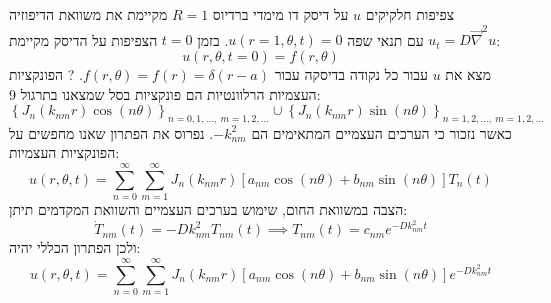 \documentclass{tstextbook}
\begin{document}
צפיפות חלקיקים \(u\) על דיסק דו מימדי ברדיוס \(R=1\) מקיימת את משוואת הדיפוזיה \(u_{t}=D\vec{\nabla} ^2u\) עם תנאי שפה \(u\left( r=1,\theta,t \right)=0\). בזמן \(t=0\) הצפיפות על הדיסק מקיימת:
$$u\left( r,\theta,t=0 \right)=f\left( r,\theta \right)$$
מצא את \(u\) עבור כל נקודה בדיסקה עבור \(f\left( r,\theta \right)=f(r)=\delta(r-a)\).
?
הפונקציות העצמיות הרלוונטיות הם פונקציות בסל שמצאנו בתרגול 9:
$$ \left\{J_{n}\left(k_{nm}r\right)\cos\left(n\theta\right)\right\}_{n=0,1,\ldots,\:m=1,2,\ldots}\cup\left\{J_{n}\left(k_{nm}r\right)\sin\left(n\theta\right)\right\}_{n=1,2,\ldots,\:m=1,2,\ldots}$$
כאשר נזכור כי הערכים העצמיים המתאימים הם \(-k_{nm}^2\). נפרוס את הפתרון שאנו מחפשים על הפונקציות העצמיות:
$$ u(r,\theta,t)=\sum_{n=0}^{\infty}\sum_{m=1}^{\infty}J_{n}(k_{nm}r)[a_{nm}\cos(n\theta)+b_{nm}\sin(n\theta)]T_{n}(t)$$
הצבה במשוואת החום, שימוש בערכים העצמיים והשוואת המקדמים תיתן:
$$\dot{T}_{nm}(t)=-Dk_{nm}^2T_{nm}(t)\implies T_{nm}(t)=c_{nm}e^{-Dk_{nm}^2t}$$
ולכן הפתרון הכללי יהיה:
$$ u(r,\theta,t)=\sum_{n=0}^\infty\sum_{m=1}^\infty J_n(k_{nm}r)[a_{nm}\cos(n\theta)+b_{nm}\sin(n\theta)]e^{-Dk_{nm}^2t}$$
\end{document}
